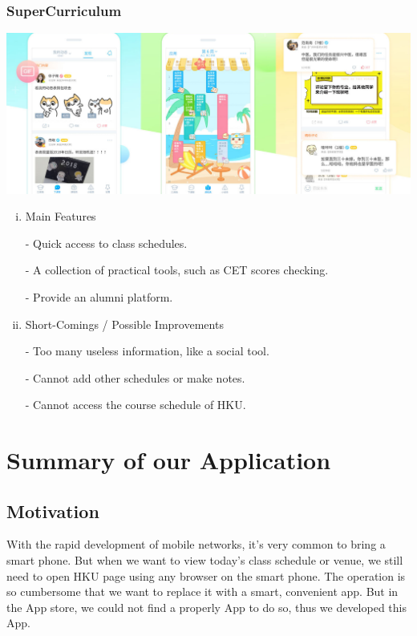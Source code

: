 \documentclass{article}
\begin{document}
    \subsubsection{SuperCurriculum}
    \begin{center}
        \includegraphics[width=6.5in]{SuperCurriculum}
    \end{center}
    \begin{enumerate}[i)]

    \item Main Features

    - Quick access to class schedules.

    - A collection of practical tools, such as CET scores checking.
    
    - Provide an alumni platform.

    \item Short-Comings / Possible Improvements
    
    - Too many useless information, like a social tool.

    - Cannot add other schedules or make notes.

    - Cannot access the course schedule of HKU.

    \end{enumerate}



    \newpage
    \section{Summary of our Application}

    \subsection{Motivation}
    With the rapid development of mobile networks, 
    it’s very common to bring a smart phone. 
    But when we want to view today’s class schedule or venue, 
    we still need to open HKU page using any browser on the smart phone. 
    The operation is so cumbersome that 
    we want to replace it with a smart, convenient app.
    But in the App store, we could not find a properly App
    to do so, thus we developed this App.
\end{document}
